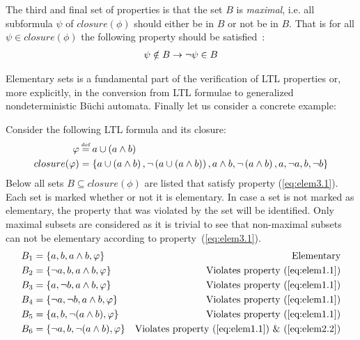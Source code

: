 The third and final set of properties is that the set $B$ is \emph{maximal}, i.e. all subformula $\psi$ of $closure(\phi)$ should either be in $B$ or not be in $B$. That is for all $\psi \in closure(\phi)$ the following property should be satisfied~\cite[Fig.~5.20]{baier2008principles}:
\begin{align}
    \psi \notin B \rightarrow \lnot \psi \in B \label{eq:elem3.1}
\end{align}

Elementary sets is a fundamental part of the verification of LTL properties or, more explicitly, in the conversion from LTL formulae to generalized nondeterministic Büchi automata. Finally let us consider a concrete example:

\begin{example}
Consider the following LTL formula and its closure:
\begin{align*}
    \phi &\eqdef a \U \left( a \land b \right) \\
    closure(\phi) &= \left\{ a \U \left( a \land b \right), \lnot \left( a \U \left( a \land b \right) \right), a \land b, \lnot \left( a \land b \right), a, \lnot a, b, \lnot b \right\}
\end{align*}
Below all sets $B \subseteq closure(\phi)$ are listed that satisfy property (\ref{eq:elem3.1}). Each set is marked whether or not it is elementary. In case a set is not marked as elementary, the property that was violated by the set will be identified. Only maximal subsets are considered as it is trivial to see that non-maximal subsets can not be elementary according to property~(\ref{eq:elem3.1}).
\begin{align*}
    B_1    &= \left\{ a,       b,       a\land b,         \phi       \right\} &\text{Elementary} \\
    B_2    &= \left\{ \lnot a, b,       a\land b,         \phi       \right\} &\text{Violates property (\ref{eq:elem1.1})} \\
    B_3    &= \left\{ a,       \lnot b, a\land b,         \phi       \right\} &\text{Violates property (\ref{eq:elem1.1})} \\
    B_4    &= \left\{ \lnot a, \lnot b, a\land b,         \phi       \right\} &\text{Violates property (\ref{eq:elem1.1})} \\
    B_5    &= \left\{ a,       b,       \lnot (a\land b), \phi       \right\} &\text{Violates property (\ref{eq:elem1.1})} \\
    B_6    &= \left\{ \lnot a, b,       \lnot (a\land b), \phi       \right\} &\text{Violates property (\ref{eq:elem1.1}) \& (\ref{eq:elem2.2})} \\

\end{align*}
\end{example}
